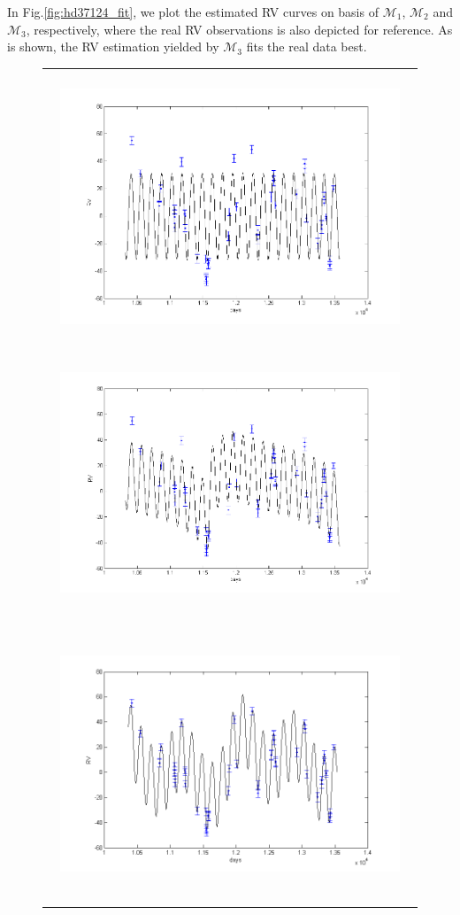 In Fig.\ref{fig:hd37124_fit}, we plot the estimated RV curves on
basis of $\mathcal{M}_1$, $\mathcal{M}_2$ and $\mathcal{M}_3$,
respectively, where the real RV observations is also depicted for
reference. As is shown, the RV estimation yielded by $\mathcal{M}_3$
fits the real data best.



\begin{figure}[!htb]
\begin{tabular}{c}
\centerline{\includegraphics[width=4in,height=3.2in]{Fig/hd37124_1p_fit.png}\includegraphics[width=4in,height=3.2in]{Fig/hd37124_2p_fit.png}}\\
\centerline{\includegraphics[width=4in,height=3.2in]{Fig/hd37124_3p_fit.png}}

\end{tabular}
\end{figure}
